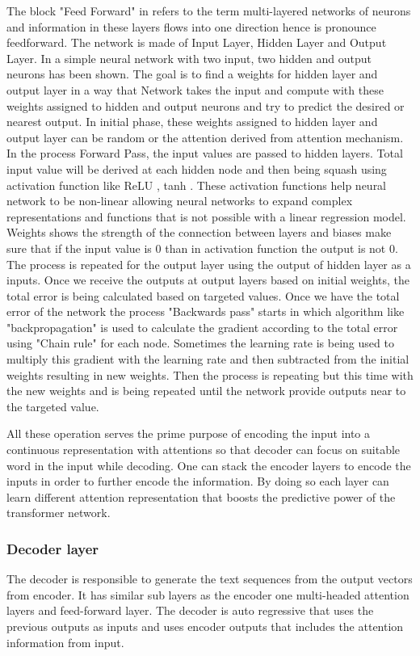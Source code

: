 The block "Feed Forward" in  refers to the term multi-layered networks of neurons and information in these layers flows into one direction hence is pronounce feedforward. The network is made of Input Layer, Hidden Layer and Output Layer. In  a simple neural network with two input, two hidden and output neurons has been shown. The goal is to find a weights for hidden layer and output layer in a way that Network takes the input and compute with these weights assigned to hidden and output neurons and try to predict the desired or nearest output. In initial phase, these weights assigned to hidden layer and output layer can be random or the attention derived from attention mechanism. In the process Forward Pass, the input values are passed to hidden layers. Total input value will be derived at each hidden node and then being squash using activation function like ReLU \cite{ReLU}, tanh \cite{tanh}. These activation functions help neural network to be non-linear allowing neural networks to expand complex representations and functions that is not possible with a linear regression model. Weights shows the strength of the connection between layers and biases make sure that if the input value is 0 than in activation function the output is not 0. The process is repeated for the output layer using the output of hidden layer as a inputs. Once we receive the outputs at output layers based on initial weights, the total error is being calculated based on targeted values. Once we have the total error of the network the process "Backwards pass" starts in which algorithm like "backpropagation" is used to calculate the gradient according to the total error using "Chain rule" for each node. Sometimes the learning rate is being used to multiply this gradient with the learning rate and then subtracted from the initial weights resulting in new weights. Then the process is repeating but this time with the new weights and is being repeated until the network provide outputs near to the targeted value. 

All these operation serves the prime purpose of encoding the input into a continuous representation with attentions so that decoder can focus on suitable word in the input while decoding. One can stack the encoder layers to encode the inputs in order to further encode the information. By doing so each layer can learn different attention representation that boosts the predictive power of the transformer network. 

\subsubsection{Decoder layer}
The decoder is responsible to generate the text sequences from the output vectors from encoder. It has similar sub layers as the encoder one multi-headed attention layers and feed-forward layer. The decoder is auto regressive that uses the previous outputs as inputs and uses encoder outputs that includes the attention information from input.

